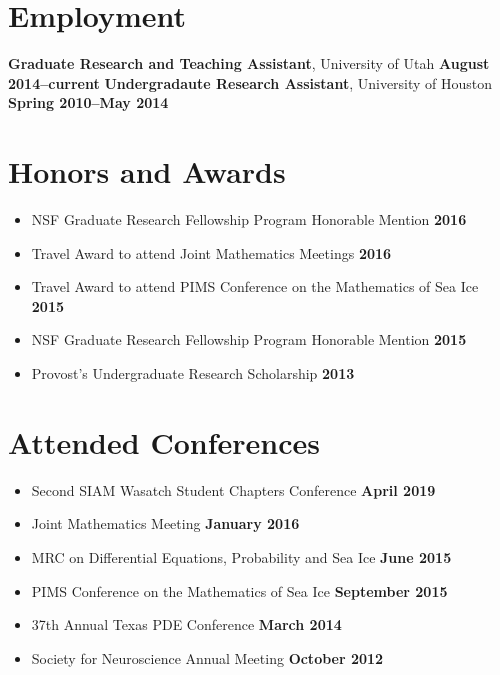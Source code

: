 \documentclass[margin,line]{res}
\begin{document}
\begin{resume}
\section{\sc Employment}
{\bf Graduate Research and Teaching Assistant}, University of Utah \hfill {\bf August 2014--current}
{\bf Undergradaute Research Assistant}, University of Houston \hfill {\bf Spring 2010--May 2014}

\section{\sc Honors and Awards}
\begin{itemize}
    \item[] NSF Graduate Research Fellowship Program Honorable Mention \hfill {\bf 2016}
    \item[] Travel Award to attend Joint Mathematics Meetings \hfill {\bf 2016}
    \item[] Travel Award to attend PIMS Conference on the Mathematics of Sea Ice \hfill {\bf 2015}
    \item[] NSF Graduate Research Fellowship Program Honorable Mention \hfill {\bf 2015}
    \item[] Provost's Undergraduate Research Scholarship \hfill {\bf 2013}
\end{itemize}
\ifx\nopubs\undefined

\else
\fi

\section{\sc Attended Conferences}
\begin{itemize}
\item[] Second SIAM Wasatch Student Chapters Conference
\hfill {\bf April 2019}
\item[] Joint Mathematics Meeting
\hfill {\bf January 2016}
\item[] MRC on Differential Equations, Probability and Sea Ice
\hfill {\bf June 2015}
\item[] PIMS Conference on the Mathematics of Sea Ice
\hfill {\bf September 2015}
\item[] 37th Annual Texas PDE Conference
\hfill {\bf March 2014}
\item[] Society for Neuroscience Annual Meeting
\hfill {\bf October 2012}
\end{itemize}


\end{resume}
\end{document}
